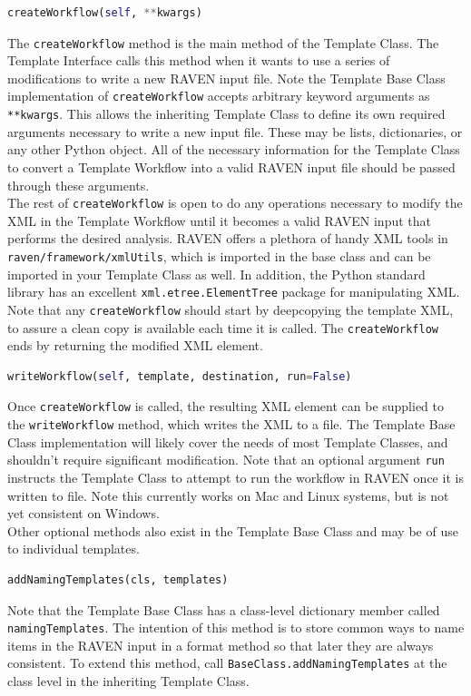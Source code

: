\begin{lstlisting}[language=python]
 createWorkflow(self, **kwargs)
\end{lstlisting}
%
The \texttt{createWorkflow} method is the main method of the Template Class. The Template Interface calls this method
%
when it wants to use a series of modifications to write a new RAVEN input file. Note the Template Base Class
%
implementation of \texttt{createWorkflow} accepts arbitrary keyword arguments as \texttt{**kwargs}. This allows the
%
inheriting Template Class to define its own required arguments necessary to write a new input file. These may be lists,
%
dictionaries, or any other Python object. All of the necessary information for the Template Class to convert a Template
%
Workflow into a valid RAVEN input file should be passed through these arguments.
\\

The rest of \texttt{createWorkflow} is open to do any operations necessary to modify the XML in the Template Workflow
%
until it becomes a valid RAVEN input that performs the desired analysis. RAVEN offers a plethora of handy XML tools in
%
\texttt{raven/framework/xmlUtils}, which is imported in the base class and can be imported in your Template Class as
%
well. In addition, the Python standard library has an excellent \texttt{xml.etree.ElementTree} package for manipulating
%
XML.  Note that any \texttt{createWorkflow} should start by deepcopying the template XML, to assure a clean copy is
%
available each time it is called. The \texttt{createWorkflow} ends by returning the modified XML element.

\begin{lstlisting}[language=python]
 writeWorkflow(self, template, destination, run=False)
\end{lstlisting}
%
Once \texttt{createWorkflow} is called, the resulting XML element can be supplied to the \texttt{writeWorkflow} method,
%
which writes the XML to a file. The Template Base Class implementation will likely cover the needs of most Template
%
Classes, and shouldn't require significant modification. Note that an optional argument \texttt{run} instructs the
%
Template Class to attempt to run the workflow in RAVEN once it is written to file. Note this currently works on Mac
%
and Linux systems, but is not yet consistent on Windows.
\\

Other optional methods also exist in the Template Base Class and may be of use to individual templates.
%
\begin{lstlisting}[language=python]
 addNamingTemplates(cls, templates)
\end{lstlisting}
%
Note that the Template Base Class has a class-level dictionary member called \texttt{namingTemplates}. The intention of
%
this method is to store common ways to name items in the RAVEN input in a format method so that later they are always
%
consistent. To extend this method, call \texttt{BaseClass.addNamingTemplates} at the class level in the inheriting
%
Template Class.
\\

